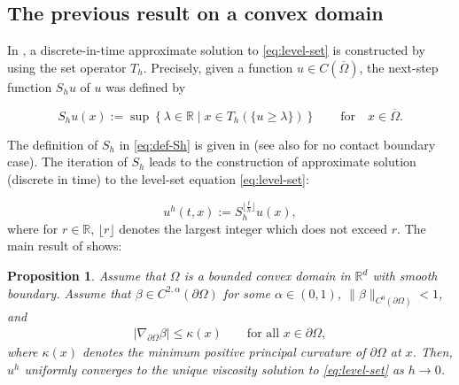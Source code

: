 \documentclass[11pt]{article}
\numberwithin{equation}{section}
\newtheorem{proposition}[theorem]{Proposition}
\newcommand{\R}{\mathbb{R}}
\newcommand{\pOmega}[0]{\partial\Omega}
\newcommand{\closure}[1]{\overline{#1}}
\def\leq{\leqslant}
\def\ge{\geqslant}
\begin{document}

\subsection{The previous result on a convex domain} In \cite{EG25}, a discrete-in-time approximate solution to \eqref{eq:level-set} is constructed by using the set operator $T_h$. Precisely, given a function $u\in C(\closure{\Omega})$, the next-step function $S_hu$ of $u$ was defined by

\begin{equation}
\label{eq:def-Sh}
    S_h u(x) := \sup\left\{\lambda\in\R \mid x\in T_h(\{u \ge \lambda\})\right\}\qquad\mbox{for}\quad x\in\overline{\Omega}.
\end{equation}

The definition of $S_h$ in \eqref{eq:def-Sh} is given in \cite{EG25} (see also \cite{EGI12-1,EGI12-2} for no contact boundary case). The iteration of $S_h$ leads to the construction of approximate solution (discrete in time) to the level-set equation \eqref{eq:level-set}:

\begin{equation}
    \label{eq:approx-sol}
    u^h(t, x) := S_h^{\lfloor \frac{t}{h} \rfloor} u(x),
\end{equation}
where for $r\in\R$, $\lfloor r\rfloor$ denotes the largest integer which does not exceed $r$.
The main result of \cite{EG25} shows:

\begin{proposition}
    \label{prop:previous}
    Assume that $\Omega$ is a bounded convex domain in $\R^d$ with smooth boundary.
    Assume that $\beta\in C^{2,\alpha}(\pOmega)$ for some $\alpha\in(0,1)$, $\|\beta\|_{C^0(\pOmega)} < 1$, and \begin{align}\label{assumption:convexity}
    |\nabla_{\partial\Omega}\beta|\leq \kappa(x)\qquad\text{for all }x\in\partial\Omega,
    \end{align}
    where $\kappa(x)$ denotes the minimum positive principal curvature of $\pOmega$ at $x$.
    Then, $u^h$ uniformly converges to the unique viscosity solution to \eqref{eq:level-set} as $h\to 0$.
\end{proposition}
\end{document}
